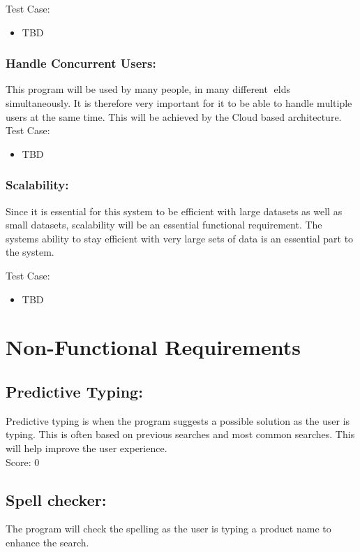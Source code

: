 \documentclass[11pt]{article}
\begin{document}
	Test Case:
	\begin{itemize}
      		\item TBD 
	 \end{itemize}
	
	\subsubsection{Handle Concurrent Users:}
This program will be used by many people, in many different elds simultaneously. It is therefore very important for it to be able to handle multiple users
 at the same time. This will be achieved by the Cloud based architecture.	
	Test Case:
	\begin{itemize}
        	\item TBD 
       \end{itemize}

	\subsubsection{Scalability:}
	Since it is essential for this system to be efficient with large datasets as well as small datasets, scalability will be an essential functional requirement. The systems ability to stay efficient with very large sets of data is an essential part to the system.
	
	Test Case:
	\begin{itemize}
      	  	\item TBD 
        \end{itemize}

	\section{Non-Functional Requirements}	
	\subsection{Predictive Typing:}
Predictive typing is when the program suggests a possible solution as the user is typing. This is often based on previous searches and most common searches. This will help improve the user experience. \\
    
	Score: 0    
    \subsection{Spell checker:}
The program will check the spelling as the user is typing a product name to enhance the search.    \\
\end{document}
